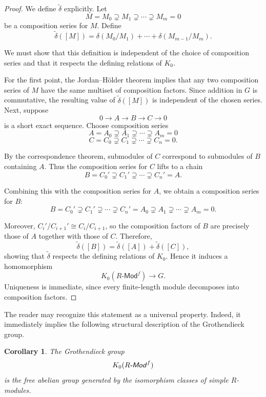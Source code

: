 \documentclass[12pt,reqno]{amsart}
\theoremstyle{plain}
\newtheorem{cor}[thm]{Corollary}
\numberwithin{equation}{section}
\begin{document}
\begin{proof}
We define $\widetilde{\delta}$ explicitly.
Let
\[
M=M_0\supsetneq M_1\supsetneq \cdots \supsetneq M_m=0
\]
be a composition series for $M$. Define
\[
\widetilde{\delta}([M])
=
\delta(M_0/M_1)
+\cdots+
\delta(M_{m-1}/M_m).
\]

We must show that this definition is independent of the choice of composition series and that it respects the defining relations of $K_0$.

For the first point, the Jordan--H\"older theorem implies that any two composition series of $M$ have the same multiset of composition factors. Since addition in $G$ is commutative, the resulting value of $\widetilde{\delta}([M])$ is independent of the chosen series.
Next, suppose
\[
0\longrightarrow A\longrightarrow B\longrightarrow C\longrightarrow 0
\]
is a short exact sequence.
Choose composition series
\[
A=A_0\supsetneq A_1\supsetneq \cdots \supsetneq A_m=0
\]
\[
C=C_0\supsetneq C_1\supsetneq \cdots \supsetneq C_n=0.
\]

By the correspondence theorem, submodules of $C$ correspond to submodules of $B$ containing $A$. Thus the composition series for $C$ lifts to a chain
\[
B=C_0'\supsetneq C_1'\supsetneq \cdots \supsetneq C_n'=A.
\]

Combining this with the composition series for $A$, we obtain a composition series for $B$:
\[
B=C_0'
\supsetneq C_1'
\supsetneq \cdots
\supsetneq C_n'
=
A_0
\supsetneq A_1
\supsetneq \cdots
\supsetneq A_m
=
0.
\]

Moreover, $C_i'/C_{i+1}'\cong C_i/C_{i+1}$, so the composition factors of $B$ are precisely those of $A$ together with those of $C$.
Therefore,
\[
\widetilde{\delta}([B])
=
\widetilde{\delta}([A])
+
\widetilde{\delta}([C]),
\]
showing that $\widetilde{\delta}$ respects the defining relations of $K_0$. Hence it induces a homomorphism
\[
K_0(R\textsf{-Mod}^f)\to G.
\]
Uniqueness is immediate, since every finite-length module decomposes into composition factors.
\end{proof}

The reader may recognize this statement as a universal property. Indeed, it immediately implies the following structural description of the Grothendieck group.

\begin{cor}
The Grothendieck group
\[
K_0(R\textsf{\emph{-Mod}}^f)
\]
is the free abelian group generated by the isomorphism classes of simple $R$-modules.
\end{cor}
\end{document}
